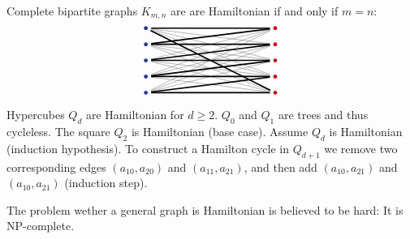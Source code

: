 Complete bipartite graphs \(K_{m,n}\) are are Hamiltonian if and only if \(m = n\):
\[
\begin{tikzpicture}[scale=0.5]
  \def\m{4} %
  \def\d{8} %
  \foreach \i in {0,...,\m} {
    \node[circle, inner sep=1.2pt, outer sep=3pt, fill=Blue] (vb\i) at (0,-\i) {};
    \node[circle, inner sep=1.2pt, outer sep=3pt, fill=red!80!black]  (vr\i) at (\d,-\i) {};
  }
  \foreach \i in {0,...,\m} {
    \foreach \j in {0,...,\m} {
      \draw[thin, color=gray] (vb\i) -- (vr\j);
    }
  }
  \foreach \i in {0,...,\m}{
    \draw[very thick,black] (vb\i) -- (vr\i); %
    \pgfmathtruncatemacro{\next}{mod(\i+1,\m+1)} %
    \draw[very thick,black] (vb\next) -- (vr\i); %
  }
\end{tikzpicture}
\]

Hypercubes \(Q_d\) are Hamiltonian for \(d\geq 2\). 
\(Q_0\) and \(Q_1\) are trees and thus cycleless.
The square \(Q_2\) is Hamiltonian (base case).
Assume \(Q_d\) is Hamiltonian (induction hypothesis).
To construct a Hamilton cycle in \(Q_{d+1}\) we remove two corresponding edges \((a_10,a_20)\) and \((a_11,a_21)\), and then add \((a_10,a_21)\) and \((a_10,a_21)\) (induction step).

The problem wether a general graph is Hamiltonian is believed to be hard: It is NP-complete.









